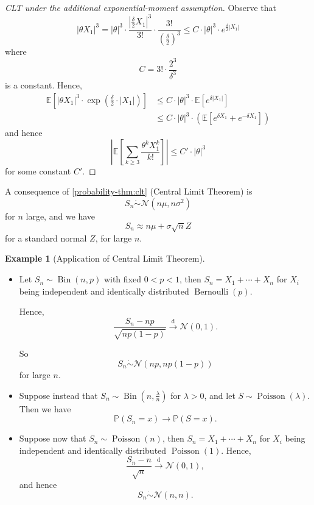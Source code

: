\documentclass[11pt]{article}
\numberwithin{equation}{section}
\theoremstyle{definition}
\newtheorem{example}[theorem]{Example}
\theoremstyle{remark}
\newcommand{\pqty}[1]{\left(#1\right)}
\newcommand{\bqty}[1]{\left[#1\right]}
\newcommand{\abs}[1]{\left|#1\right|}
\newcommand{\Prob}{\mathbb P}
\newcommand{\Expt}{\mathbb E}
\newcommand{\toDist}{\xrightarrow{\mathrm d}}
\newcommand{\Bernoulli}{\operatorname{Bernoulli}}
\newcommand{\Binomial}{\operatorname{Bin}}
\newcommand{\Poisson}{\operatorname{Poisson}}
\newcommand{\Normal}{\mathcal N}
\begin{document}
\begin{proof}[CLT under the additional exponential-moment assumption]
    Observe that
    \[
        \abs{\theta X_1}^3 = \abs{\theta}^3 \cdot \frac{\abs{\frac{\delta}{2} X_1}^3}{3!} \cdot \frac{3!}{\pqty{\frac{\delta}{2}}^3} \leq C \cdot \abs{\theta}^3 \cdot e^{\frac{\delta}{2} \abs{X_1}}
    \]
    where
    \[
        C = 3! \cdot \frac{2^3}{\delta^3}
    \]
    is a constant. Hence,
    \begin{align*}
        \Expt\bqty{\abs{\theta X_1}^3 \cdot \exp \pqty{\frac{\delta}{2} \cdot \abs{X_1}}} &\leq C \cdot \abs{\theta}^3 \cdot \Expt\bqty{e^{\delta \abs{X_1}}} \\
        &\leq C \cdot \abs{\theta}^3 \cdot \pqty{\Expt\bqty{e^{\delta X_1} + e^{- \delta X_1}}}
    \end{align*}
    and hence
    \[
        \abs{\Expt\bqty{\sum_{k \geq 3} \frac{\theta^k X_1^k}{k!}}} \leq C' \cdot \abs{\theta}^3
    \]
    for some constant \(C'\).
\end{proof}

A consequence of \autoref{probability-thm:clt} (Central Limit Theorem) is
\[
    S_n \dot{\sim} \Normal\pqty{n \mu, n \sigma^2}
\]
for \(n\) large, and we have
\[
    S_n \approx n \mu + \sigma \sqrt{n} Z
\]
for a standard normal \(Z\), for large \(n\).

\begin{example}[Application of Central Limit Theorem]\label{probability-example-044}
    \label{probability-ex:clt}%
    \begin{itemize}
        \item Let \(S_n \sim \Binomial\pqty{n, p}\) with fixed \(0<p<1\), then \(S_n = X_1 + \cdots + X_n\) for \(X_i\) being independent and identically distributed \(\Bernoulli \pqty{p}\).

        Hence,
        \[
            \frac{S_n - np}{\sqrt{n p \pqty{1 - p}}} \toDist \Normal\pqty{0, 1}.
        \]

        So
        \[
            S_n \dot{\sim} \Normal\pqty{np, np\pqty{1 - p}}
        \]
        for large \(n\).

        \item Suppose instead that \(S_n \sim \Binomial\pqty{n, \frac{\lambda}{n}}\) for \(\lambda > 0\), and let \(S \sim \Poisson\pqty{\lambda}\). Then we have
        \[
            \Prob\pqty{S_n = x} \to \Prob\pqty{S = x}.
        \]

        \item Suppose now that \(S_n \sim \Poisson\pqty{n}\), then \(S_n = X_1 + \cdots + X_n\) for \(X_i\) being independent and identically distributed \(\Poisson \pqty{1}\). Hence,
        \[
            \frac{S_n - n}{\sqrt{n}} \toDist \Normal\pqty{0, 1},
        \]
        and hence
        \[
            S_n \dot{\sim} \Normal\pqty{n, n}.
        \]
    \end{itemize}
\end{example}
\end{document}
